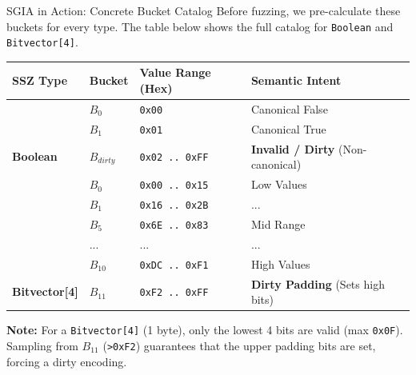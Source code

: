 \documentclass[aspectratio=169, 10pt, xcolor={table,dvipsnames}]{beamer}
\begin{document}
\begin{frame}{SGIA in Action: Concrete Bucket Catalog}
    Before fuzzing, we pre-calculate these buckets for every type. 
    The table below shows the full catalog for \texttt{Boolean} and \texttt{Bitvector[4]}.
    
    \vspace{0.2cm}
    \centering
    \begin{table}
    \scriptsize
    \renewcommand{\arraystretch}{1.2}
    \setlength{\tabcolsep}{8pt}
    \begin{tabular}{l l l l}
        \toprule
        \textbf{SSZ Type} & \textbf{Bucket} & \textbf{Value Range (Hex)} & \textbf{Semantic Intent} \\
        \midrule
          & $B_{0}$ & \texttt{0x00} & Canonical False \\
          & $B_{1}$ & \texttt{0x01} & Canonical True \\
        \multirow{-3}{*}{\textbf{Boolean}} & \cellcolor{efred!20}$B_{dirty}$ & \texttt{0x02 .. 0xFF} & \textbf{Invalid / Dirty} (Non-canonical) \\
        \hline
          & $B_{0}$ & \texttt{0x00 .. 0x15} & Low Values \\
          & $B_{1}$ & \texttt{0x16 .. 0x2B} & ... \\
          & $B_{5}$ & \texttt{0x6E .. 0x83} & Mid Range \\
          & ... & ... & ... \\
          & $B_{10}$ & \texttt{0xDC .. 0xF1} & High Values \\
        \multirow{-6}{*}{\textbf{Bitvector[4]}} & \cellcolor{efred!20}$B_{11}$ & \texttt{0xF2 .. 0xFF} & \textbf{Dirty Padding} (Sets high bits) \\
        \bottomrule
    \end{tabular}
    \end{table}
    
    \vspace{0.1cm}
    \raggedright
    \scriptsize
    \textbf{Note:} For a \texttt{Bitvector[4]} (1 byte), only the lowest 4 bits are valid (max \texttt{0x0F}). Sampling from $B_{11}$ (\texttt{>0xF2}) guarantees that the upper padding bits are set, forcing a dirty encoding.
\end{frame}
\end{document}
